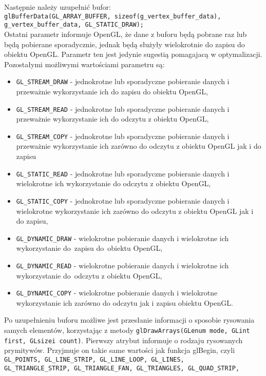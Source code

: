 Następnie należy uzupełnić bufor: \\
\verb$glBufferData(GL_ARRAY_BUFFER, sizeof(g_vertex_buffer_data),$\\
\verb$g_vertex_buffer_data, GL_STATIC_DRAW);$\\
Ostatni parametr informuje OpenGL, że dane z buforu będą pobrane raz lub będą pobierane sporadycznie, jednak będą służyły wielokrotnie do zapisu do obiektu OpenGL. Parametr ten jest jedynie sugestią pomagajacą w optymalizacji. Pozostałymi możliwymi wartościami parametru są:
\begin{itemize}
\item \verb$GL_STREAM_DRAW$ - jednokrotne lub sporadyczne pobieranie danych i przeważnie wykorzystanie ich do zapisu do obiektu OpenGL,
\item \verb$GL_STREAM_READ$ - jednokrotne lub sporadyczne pobieranie danych i przeważnie wykorzystanie ich do odczytu z obiektu OpenGL,
\item \verb$GL_STREAM_COPY$ - jednokrotne lub sporadyczne pobieranie danych i przeważnie wykorzystanie ich zarówno do odczytu z obiektu OpenGL jak i do zapisu
\item \verb$GL_STATIC_READ$ - jednokrotne lub sporadyczne pobieranie danych i wielokrotne ich wykorzystanie do odczytu z obiektu OpenGL,
\item \verb$GL_STATIC_COPY$ - jednokrotne lub sporadyczne pobieranie danych i wielokrotne wykorzystanie ich zarówno do odczytu z obiektu OpenGL jak i do zapisu,
\item \verb$GL_DYNAMIC_DRAW$ - wielokrotne pobieranie danych i wielokrotne ich wykorzystanie do~zapisu do~obiektu OpenGL,
\item \verb$GL_DYNAMIC_READ$ - wielokrotne pobieranie danych i wielokrotne ich wykorzystanie do~odczytu z obiektu OpenGL,
\item \verb$GL_DYNAMIC_COPY$ - wielokrotne pobieranie danych i wielokrotne wykorzystanie ich zarówno do odczytu jak i zapisu obiektu OpenGL.
\end{itemize}
Po uzupełnieniu buforu możliwe jest przesłanie informacji o sposobie rysowania samych elementów, korzystając z metody \verb$glDrawArrays(GLenum mode, GLint first, GLsizei count)$. Pierwszy atrybut informuje o rodzaju rysowanych prymitywów. Przyjmuje on takie same wartości jak funkcja glBegin, czyli \verb$GL_POINTS, GL_LINE_STRIP, GL_LINE_LOOP, GL_LINES,$\\
\verb$GL_TRIANGLE_STRIP, GL_TRIANGLE_FAN, GL_TRIANGLES, GL_QUAD_STRIP,$\\
